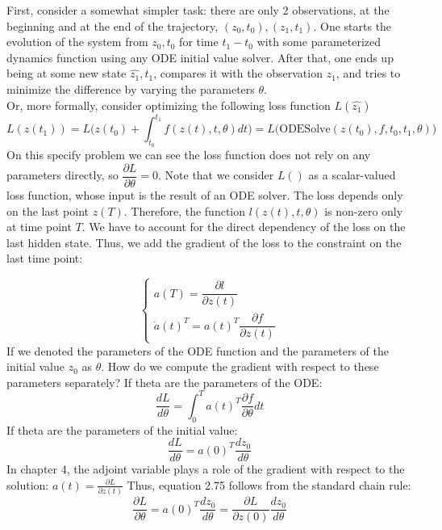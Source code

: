 \documentclass{article}
\theoremstyle{theorem}
\theoremstyle{definition}
\begin{document}
First, consider a somewhat simpler task: there are only 2 observations, at the beginning and at the end of the trajectory, $(z_0, t_0), (z_1, t_1)$. One starts the evolution of the system from $z_0, t_0$ for time $t_1 - t_0$ with some parameterized dynamics function using any ODE initial value solver. After that, one ends up being at some new state $\hat{z_1}, t_1$, compares it with the observation $z_1$, and tries to minimize the difference by varying the parameters $\theta.$\\
Or, more formally, consider optimizing the following loss function $ L(\hat{z_1})$ 
$$L(z(t_1)) = L \Big(z(t_0)+ \int_{t_0}^{t_1} f(z(t), t, \theta)dt \Big) = L \big( \text{ODESolve}(z(t_0), f, t_0, t_1, \theta) \big)$$
 On this specify problem we can see the loss function does not rely on any parameters directly, so $\dfrac{\partial L}{\partial \theta}=0$. Note that we consider $L()$ as a scalar-valued loss function, whose input is the result of an ODE solver.
 The loss depends only on the last point $z(T)$. Therefore, the function $l(z(t), t, \theta)$ is non-zero only at time point $T$. We have to account for the direct dependency of the loss on the last hidden state. Thus, we add the gradient of the loss to the constraint on the last time point:

 $$\left\{\begin{matrix}
 	a(T)=	\dfrac{\partial l}{\partial z(t)}	\\ 
  \dot{a}(t)^T=a(t)^T \dfrac{\partial f}{\partial z(t)}
 \end{matrix}\right.$$
 If we denoted the parameters of the ODE function and the parameters of the initial value $z_0$ as $\theta$.
 How do we compute the gradient with respect to these parameters separately?
 If theta are the parameters of the ODE:
 $$\frac{dL}{d\theta}= \int_{0}^{T}  a(t)^T \frac{\partial f}{ \partial \theta}dt$$
 If theta are the parameters of the initial value:
 $$\frac{dL}{d\theta}= a(0)^T\frac{dz_0}{d\theta}$$
 In chapter 4, the adjoint variable plays a role of the gradient with respect to the solution: $a(t)=\frac{\partial L}{\partial z(t)}$
 Thus, equation 2.75 follows from the standard chain rule: $$\frac{\partial L}{\partial \theta}=a(0)^T \frac{dz_0}{d \theta}=\frac{\partial L}{\partial z(0)} \frac{dz_0}{d \theta}$$
		
	
\end{document}
